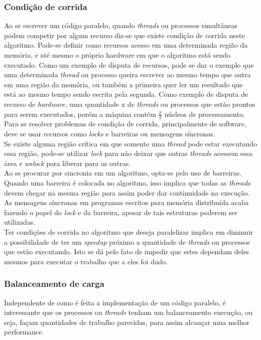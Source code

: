 \documentclass[12pt]{article}
\newcommand\tab[1][1cm]{\hspace*{#1}}
\begin{document}
\subsubsection{Condição de corrida}\label{subsubsec:racecond}
\tab Ao se escrever um código paralelo, quando \textit{threads} ou processos simultâneas podem competir por algum recurso diz-se que existe condição de corrida neste algoritmo. Pode-se definir como recursos acesso em uma determinada região da memória, e até mesmo o próprio hardware em que o algoritmo está sendo executado. Como um exemplo de disputa de recursos, pode se dar o exemplo que uma determinada \textit{thread} ou processo queira escrever ao mesmo tempo que outra em uma região da memória, ou também a primeira quer ler um resultado que está ao mesmo tempo sendo escrita pela segunda. Como exemplo de disputa de recurso de \textit{hardware}, uma quantidade x de \textit{threads} ou processos que estão prontos para serem executados, porém a máquina contém $\frac{x}{2}$ núcleos de processamento.
\\
\tab Para se resolver problemas de condição de corrida, principalmente de software, deve se usar recursos como \textit{locks} e barreiras ou mensagens síncronas. 
\\
\tab Se existe alguma região crítica em que somente uma \textit{thread} pode estar executando essa região, pode-se utilizar \textit{lock} para não deixar que outras \textit{threads} acessem essa área e \textit{unlock} para liberar para as outras.
\\
\tab Ao se procurar por sincronia em um algoritmo, opta-se pelo uso de barreiras. Quando uma barreira é colocada no algoritmo, isso implica que todas as \textit{threads} devem chegar na mesma região para assim poder dar continuidade na execução.
\\
\tab As mensagens síncronas em programas escritos para memória distribuída acaba fazendo o papel do \textit{lock} e da barreira, apesar de tais estruturas poderem ser utilizadas.
\\
\tab Ter condições de corrida no algoritmo que deseja paralelizar implica em diminuir a possibilidade de ter um \textit{speedup} próximo a quantidade de \textit{threads} ou processos que estão executando. Isto se dá pelo fato de impedir que estes dependam deles mesmos para executar o trabalho que a eles foi dado.

\subsubsection{Balanceamento de carga}\label{subsubsec:cargabalanc}
\tab Independente de como é feita a implementação de um código paralelo, é interessante que os processos ou \textit{threads} tenham um balanceamento execução, ou seja, façam quantidades de trabalho parecidas, para assim alcançar uma melhor performance. 
\end{document}
